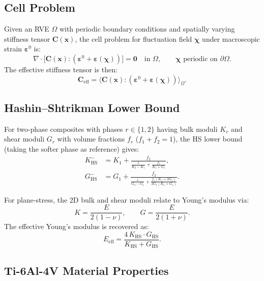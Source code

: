 \documentclass[12pt,a4paper]{article}
\newcommand{\Eeff}{E_{\mathrm{eff}}}
\newcommand{\xvec}{\bm{x}}
\newcommand{\epsvec}{\bm{\varepsilon}}
\theoremstyle{definition}
\begin{document}
\subsection{Cell Problem}

Given an RVE $\Omega$ with periodic boundary conditions and spatially
varying stiffness tensor $\bm{C}(\xvec)$, the cell problem for
fluctuation field $\bm{\chi}$ under macroscopic strain
$\epsvec^0$ is:
\begin{equation}
  \nabla \cdot \bigl[ \bm{C}(\xvec) : (\epsvec^0 + \epsvec(\bm{\chi})) \bigr] = \bm{0}
  \quad \text{in } \Omega, \qquad \bm{\chi} \text{ periodic on } \partial\Omega.
  \label{eq:cell_problem}
\end{equation}
The effective stiffness tensor is then:
\begin{equation}
  \bm{C}_{\mathrm{eff}} = \langle \bm{C}(\xvec) : (\epsvec^0 + \epsvec(\bm{\chi})) \rangle_\Omega.
  \label{eq:Ceff}
\end{equation}

\subsection{Hashin--Shtrikman Lower Bound}

For two-phase composites with phases $r \in \{1,2\}$ having bulk moduli
$K_r$ and shear moduli $G_r$ with volume fractions $f_r$ ($f_1 + f_2 = 1$),
the HS lower bound (taking the softer phase as reference) gives:
\begin{align}
  K_{\mathrm{HS}}^{-} &= K_1 + \frac{f_2}{\displaystyle \frac{1}{K_2 - K_1} + \frac{f_1}{K_1 + G_1}},
  \label{eq:hs_K} \\[6pt]
  G_{\mathrm{HS}}^{-} &= G_1 + \frac{f_2}{\displaystyle \frac{1}{G_2 - G_1} + \frac{f_1(K_1 + 2G_1)}{2G_1(K_1 + G_1)}}.
  \label{eq:hs_G}
\end{align}

For plane-stress, the 2D bulk and shear moduli relate to Young's modulus via:
\begin{equation}
  K = \frac{E}{2(1-\nu)}, \qquad G = \frac{E}{2(1+\nu)}.
  \label{eq:KG}
\end{equation}
The effective Young's modulus is recovered as:
\begin{equation}
  \Eeff = \frac{4\, K_{\mathrm{HS}} \cdot G_{\mathrm{HS}}}{K_{\mathrm{HS}} + G_{\mathrm{HS}}}.
  \label{eq:Eeff_from_KG}
\end{equation}

\subsection{Ti-6Al-4V Material Properties}
\label{sec:material}
\end{document}
